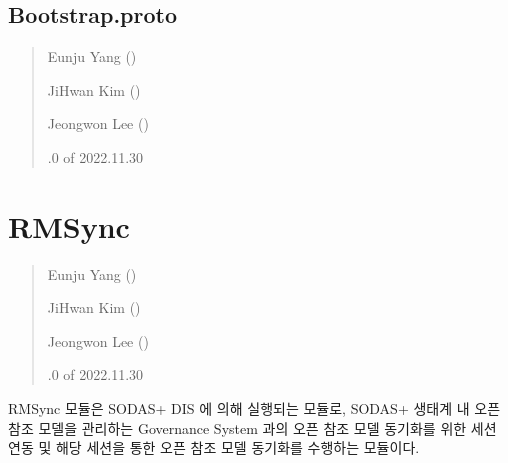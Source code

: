 \documentclass[a4paper,10pt,english]{sphinxmanual}
\begin{document}
\section{Bootstrap.proto}
\label{\detokenize{_BootstrapProto:bootstrap-proto}}\label{\detokenize{_BootstrapProto:bootstrapproto}}\label{\detokenize{_BootstrapProto::doc}}\begin{quote}\begin{description}
\begin{DUlineblock}{0em}
\item[] Eunju Yang ()
\item[] JiHwan Kim ()
\item[] Jeongwon Lee ()
\end{DUlineblock}

.0 of 2022.11.30

\end{description}\end{quote}

\sphinxstepscope


\chapter{RMSync}
\label{\detokenize{RMSync:rmsync}}\label{\detokenize{RMSync:rmsyncmodule}}\label{\detokenize{RMSync::doc}}\begin{quote}\begin{description}
\begin{DUlineblock}{0em}
\item[] Eunju Yang ()
\item[] JiHwan Kim ()
\item[] Jeongwon Lee ()
\end{DUlineblock}

.0 of 2022.11.30

\end{description}\end{quote}

\sphinxAtStartPar
RMSync 모듈은 SODAS+ DIS {\hyperref[\detokenize{_DHDaemon:dhdaemon}]{}} 에 의해 실행되는 모듈로, SODAS+ 생태계 내 오픈 참조 모델을 관리하는 Governance System 과의 오픈 참조 모델 동기화를 위한 세션 연동 및 해당 세션을 통한 오픈 참조 모델 동기화를 수행하는 모듈이다.
\end{document}
